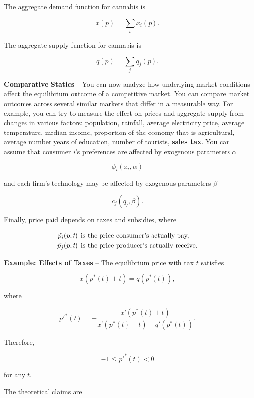 \documentclass[11pt]{article}
\begin{document}
\vspace{\baselineskip}
The aggregate demand function for cannabis is

$$
x(p) = \sum_i x_i(p).
$$

The aggregate supply function for cannabis is

$$
q(p) = \sum_j q_j(p).
$$

\vspace{\baselineskip}
{\bfseries Comparative Statics} -- You can now analyze how underlying market conditions affect the equilibrium outcome of a competitive market. You can compare market outcomes across several similar markets that differ in a measurable way. For example, you can try to measure the effect on prices and aggregate supply from changes in various factors: population, rainfall, average electricity price, average temperature, median income, proportion of the economy that is agricultural, average number years of education, number of tourists, {\bfseries sales tax}. You can assume that consumer $i$'s preferences are affected by exogenous parameters $\alpha$

$$
\phi_i(x_i, \alpha)
$$

\vspace{\baselineskip}
and each firm's technology may be affected by exogenous parameters $\beta$

$$
c_j(q_j, \beta).
$$

\vspace{\baselineskip}
Finally, price paid depends on taxes and subsidies, where

\begin{align*}
\hat{p_i}(p, t) &\hspace{1ex}\text{is the price consumer's actually pay,}\\
\hat{p_j}(p, t) &\hspace{1ex}\text{is the price producer's actually receive.}
\end{align*}


\newpage
{\bfseries Example: Effects of Taxes} -- The equilibrium price with tax $t$ satisfies

$$
x(p^*(t) + t) = q(p^*(t)),
$$

where

$$
p'^{*}(t) = - \frac{x'(p^*(t) + t )}{x'(p^*(t) + t ) - q'(p^*(t))}.
$$

Therefore,

$$
-1 \leq p'^{*}(t) < 0
$$

for any $t$.

\vspace{\baselineskip}
The theoretical claims are
\end{document}
